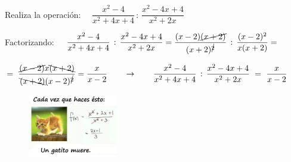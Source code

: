 \begin{miejemplo}

Realiza la operación: $\quad \dfrac{x^2-4}{x^2+4x+4}\, : \, \dfrac{x^2-4x+4}{x^2+2x}$	

\vspace{2mm} Factorizando: $\quad \dfrac{x^2-4}{x^2+4x+4}\, : \, \dfrac{x^2-4x+4}{x^2+2x} = 
\dfrac{(x-2)\cancel{(x+2)}}{(x+2)^{\cancel{2}}}\, : \, \dfrac{(x-2)^2}{x(x+2)}= $

\vspace{2mm} $=\ \dfrac{\cancel{(x-2)}x\bcancel{(x+2)}}{\bcancel{(x+2)}(x-2)^{\cancel{2}}}=\dfrac{x}{x-2} \qquad \to \qquad \dfrac{x^2-4}{x^2+4x+4}\, : \, \dfrac{x^2-4x+4}{x^2+2x} \ = \ \dfrac{x}{x-2}$

\vspace{2mm} 

\vspace{2mm} 
\end{miejemplo}


\begin{figure}[H]
	\centering
	\includegraphics[width=0.35\textwidth]{img-pol/pol05.png}
\end{figure}




